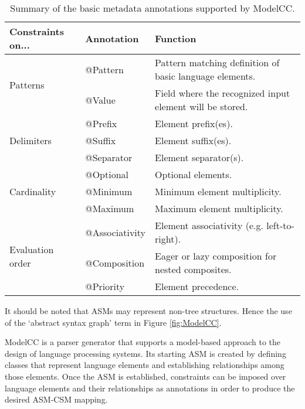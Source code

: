 \documentclass[floatfix,rmp,twocolumn,twoside]{revtex4}
\begin{document}
\begin{table*}[tb]
\begin{center}

\setlength{\tabcolsep}{5pt}
\begin{tabular}{ l  l  l } \hline

Constraints on... & Annotation & Function \\ \hline

\multirow{2}{*}{Patterns}
& @Pattern & Pattern matching definition of basic language elements. \\
& @Value & Field where the recognized input element will be stored. \\ \hline

\multirow{3}{*}{Delimiters}
& @Prefix & Element prefix(es). \\
& @Suffix & Element suffix(es). \\
& @Separator & Element separator(s). \\ \hline

\multirow{3}{*}{Cardinality}
& @Optional & Optional elements.\\
& @Minimum & Minimum element multiplicity.\\
& @Maximum & Maximum element multiplicity.\\ \hline

\multirow{3}{50pt}{Evaluation order}
& @Associativity & Element associativity (e.g. left-to-right). \\
& @Composition & Eager or lazy composition for nested composites. \\
& @Priority & Element precedence. \\ \hline
\end{tabular}
\end{center}
\caption{Summary of the basic metadata annotations supported by ModelCC.} \label{fig:tablesummary}
\end{table*}

It should be noted that ASMs may represent non-tree structures. Hence the use of the `abstract syntax graph' term in Figure \ref{fig:ModelCC}.

ModelCC \cite{Quesada2011c} is a parser generator that supports a model-based approach to the design of language processing systems.
Its starting ASM is created by defining classes that represent language elements and establishing relationships among those elements. Once the ASM is established, constraints can be imposed over language elements and their relationships as annotations in order to produce the desired ASM-CSM mapping.
\end{document}
